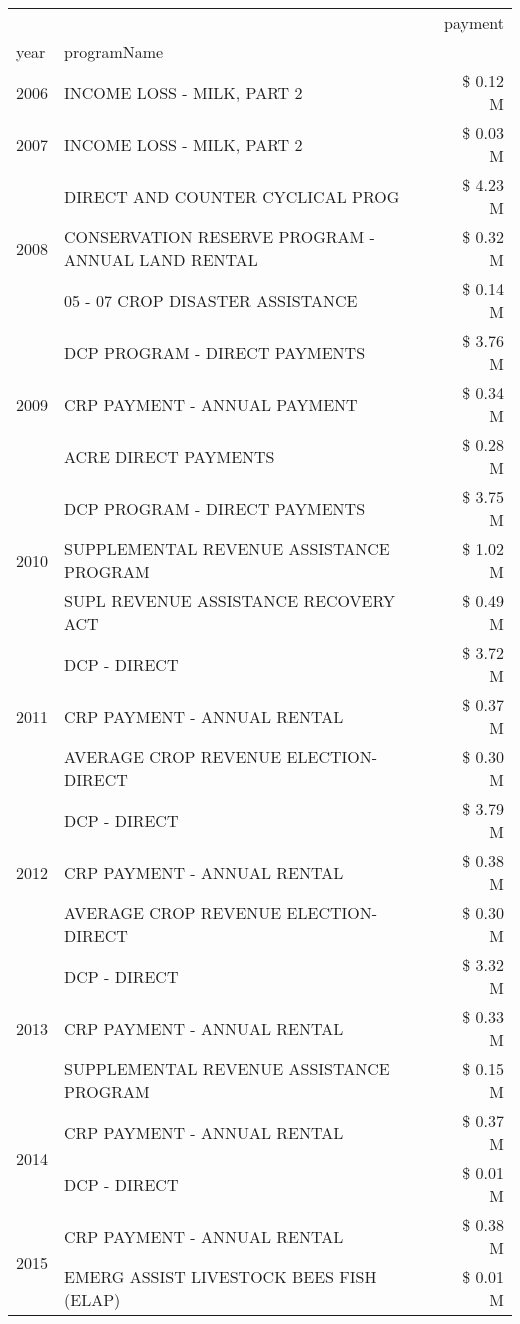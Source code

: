 \begin{tabular}{llr}
\toprule
 &  & payment \\
year & programName &  \\
\midrule
2006 & INCOME LOSS - MILK, PART 2 & \$ 0.12 M \\
\cline{1-3}
2007 & INCOME LOSS - MILK, PART 2 & \$ 0.03 M \\
\cline{1-3}
\multirow[t]{3}{*}{2008} & DIRECT AND COUNTER CYCLICAL PROG & \$ 4.23 M \\
 & CONSERVATION RESERVE PROGRAM - ANNUAL LAND RENTAL & \$ 0.32 M \\
 & 05 - 07 CROP DISASTER ASSISTANCE & \$ 0.14 M \\
\cline{1-3}
\multirow[t]{3}{*}{2009} & DCP PROGRAM - DIRECT PAYMENTS & \$ 3.76 M \\
 & CRP PAYMENT - ANNUAL PAYMENT & \$ 0.34 M \\
 & ACRE DIRECT PAYMENTS & \$ 0.28 M \\
\cline{1-3}
\multirow[t]{3}{*}{2010} & DCP PROGRAM - DIRECT PAYMENTS & \$ 3.75 M \\
 & SUPPLEMENTAL REVENUE ASSISTANCE PROGRAM & \$ 1.02 M \\
 & SUPL REVENUE ASSISTANCE RECOVERY ACT & \$ 0.49 M \\
\cline{1-3}
\multirow[t]{3}{*}{2011} & DCP - DIRECT & \$ 3.72 M \\
 & CRP PAYMENT - ANNUAL RENTAL & \$ 0.37 M \\
 & AVERAGE CROP REVENUE ELECTION-DIRECT & \$ 0.30 M \\
\cline{1-3}
\multirow[t]{3}{*}{2012} & DCP - DIRECT & \$ 3.79 M \\
 & CRP PAYMENT - ANNUAL RENTAL & \$ 0.38 M \\
 & AVERAGE CROP REVENUE ELECTION-DIRECT & \$ 0.30 M \\
\cline{1-3}
\multirow[t]{3}{*}{2013} & DCP - DIRECT & \$ 3.32 M \\
 & CRP PAYMENT - ANNUAL RENTAL & \$ 0.33 M \\
 & SUPPLEMENTAL REVENUE ASSISTANCE PROGRAM & \$ 0.15 M \\
\cline{1-3}
\multirow[t]{2}{*}{2014} & CRP PAYMENT - ANNUAL RENTAL & \$ 0.37 M \\
 & DCP - DIRECT & \$ 0.01 M \\
\cline{1-3}
\multirow[t]{3}{*}{2015} & CRP PAYMENT - ANNUAL RENTAL & \$ 0.38 M \\
 & EMERG ASSIST LIVESTOCK BEES FISH (ELAP) & \$ 0.01 M \\

\end{tabular}
